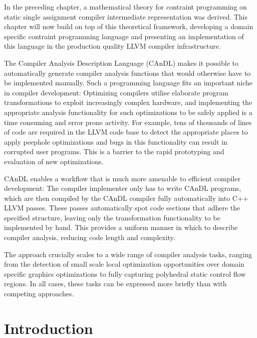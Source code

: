 
    In the preceding chapter, a mathematical theory for contraint programming on
    static single assignment compiler intermediate representation was derived.
    This chapter will now build on top of this theoretical framework, developing
    a domain specific contraint programming language and presenting an
    implementation of this language in the production quality LLVM compiler
    infrastructure.

    The Compiler Analysis Description Language (CAnDL) makes it possible to
    automatically generate compiler analysis functions that would otherwise
    have to be implemented manually.
    Such a programming language fits an important niche in compiler development:
    Optimizing compilers utilise elaborate program transformations to exploit
    increasingly complex hardware, and implementing the appropriate analysis
    functionality for such optimizations to be safely applied is a time
    consuming and error prone activity.
    For example, tens of thousands of lines of code are required in the LLVM
    code base to detect the appropriate places to apply peephole optimizations
    and bugs in this functionality can result in corrupted user programs.
    This is a barrier to the rapid prototyping and evaluation of new
    optimizations.

    CAnDL enables a workflow that is much more amenable to efficient compiler
    development:
    The compiler implementer only has to write CAnDL programs, which are then
    compiled by the CAnDL compiler fully automatically into C++ LLVM passes.
    These passes automatically spot code sections that adhere the specified
    structure, leaving only the transformation functionality to be implemented
    by hand.
    This provides a uniform manner in which to describe compiler analysis,
    reducing code length and complexity.

    The approach crucially scales to a wide range of compiler analysis tasks,
    ranging from the detection of small scale local optimization opportunities
    over domain specific graphics optimizations to fully capturing polyhedral
    static control flow regions.
    In all cases, these tasks can be  expressed more briefly than with competing
    approaches.

\section{Introduction}


